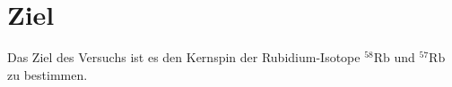 \section{Ziel}
\label{sec:ziel}

Das Ziel des Versuchs ist es den Kernspin der Rubidium-Isotope $^{58}\text{Rb}$ und $^{57}\text{Rb}$ zu bestimmen.